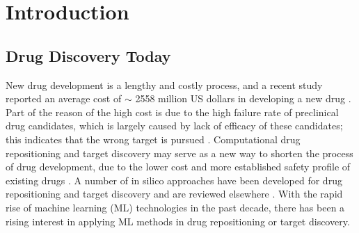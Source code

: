 \chapter{Introduction}
  \section{Drug Discovery Today}
    New drug development is a lengthy and costly process, and a recent study reported an average cost of $\sim$ 2558 million US dollars in developing a new drug \cite{dimasi2016innovation}. Part of the reason of the high cost is due to the high failure rate of preclinical drug candidates, which is largely caused by lack of efficacy of these candidates; this indicates that the wrong target is pursued \cite{shih2018drug}. Computational drug repositioning and target discovery may serve as a new way to shorten the process of drug development, due to the lower cost and more established safety profile of existing drugs \cite{dudley2011exploiting}. A number of in silico approaches have been developed for drug repositioning and target discovery and are reviewed elsewhere \cite{hodos2016silico,vanhaelen2017design,kandoi2015prediction}. With the rapid rise of machine learning (ML) technologies in the past decade, there has been a rising interest in applying ML methods in drug repositioning or target discovery. 

